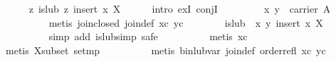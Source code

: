 \begin{isabellebody}
\ \ \ \ \isamarkupfalse%
\ {}{}z{}\ is{}lub\ z\ {}insert\ x\ X{}{}\isanewline
\ \ \ \ \isamarkupfalse%
\ {}intro\ exI\ conjI{}\isanewline
\ \ \ \ \ \ \isamarkupfalse%
\ {}{}\ {}x{}\ y{}\ {}\ carrier\ A{}\isanewline
\ \ \ \ \ \ \ \ \isamarkupfalse%
\ {}metis\ join{}closed\ join{}def\ xc\ yc{}\isanewline
\ \ \ \ \ \ \isamarkupfalse%
\ {}is{}lub\ {}{}\ {}x{}\ y{}{}\ {}insert\ x\ X{}{}\isanewline
\ \ \ \ \ \ \ \ \isamarkupfalse%
\ {}simp\ add{}\ is{}lub{}simp{}\ safe{}\isanewline
\ \ \ \ \ \ \ \ \isamarkupfalse%
\ {}metis\ xc{}\isanewline
\ \ \ \ \ \ \ \ \isamarkupfalse%
\ {}metis\ X{}subset\ set{}mp{}\isanewline
\ \ \ \ \ \ \ \ \isamarkupfalse%
\ {}metis\ bin{}lub{}var\ join{}def\ order{}refl\ xc\ yc{}\isanewline

\end{isabellebody}
